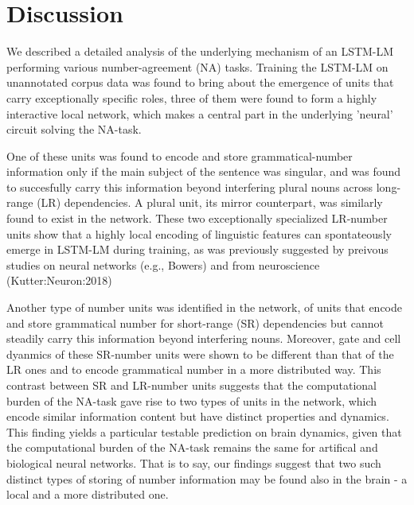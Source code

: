 
\section{Discussion}
We described a detailed analysis of the underlying mechanism of an LSTM-LM performing various number-agreement (NA) tasks. Training the LSTM-LM on unannotated corpus data was found to bring about the emergence of units that carry exceptionally specific roles, three of them were found to form a highly interactive local network, which makes a central part in the underlying 'neural' circuit solving the NA-task. 

One of these units was found to encode and store grammatical-number information only if the main subject of the sentence was singular, and was found to succesfully carry this information beyond interfering plural nouns across long-range (LR) dependencies. A plural unit, its mirror counterpart, was similarly found to exist in the network. These two exceptionally specialized LR-number units show that a highly local encoding of linguistic features can spontateously emerge in LSTM-LM during training, as was previously suggested by preivous studies on neural networks (e.g., Bowers) and from neuroscience (Kutter:Neuron:2018)

Another type of number units was identified in the network, of units that encode and store grammatical number for short-range (SR) dependencies but cannot steadily carry this information beyond interfering nouns. Moreover, gate and cell dyanmics of these SR-number units were shown to be different than that of the LR ones and to encode grammatical number in a more distributed way. This contrast between SR and LR-number units suggests that the computational burden of the NA-task gave rise to two types of units in the network, which encode similar information content but have distinct properties and dynamics. This finding yields a particular testable prediction on brain dynamics, given that the computational burden of the NA-task remains the same for artifical and biological neural networks. That is to say, our findings suggest that two such distinct types of storing of number information may be found also in the brain - a local and a more distributed one.  

